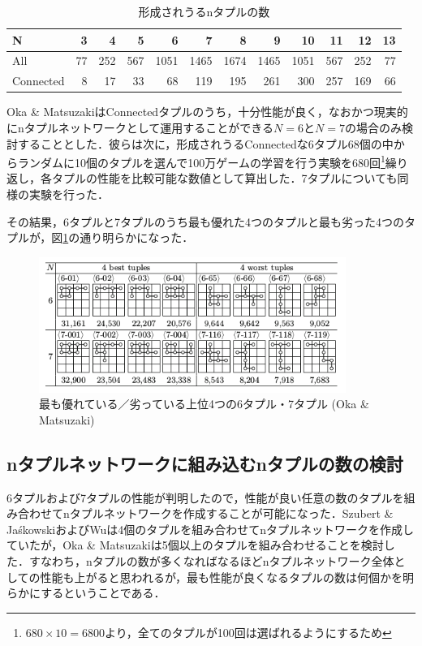 \documentclass{suribt}
\begin{document}
\begin{table}[t]
	\begin{center}
		\caption{形成されうるnタプルの数}
		\begin{tabular}{l|r|r|r|r|r|r|r|r|r|r|r} \hline
		N & 3 & 4 & 5 & 6 & 7 & 8 & 9 & 10 & 11 & 12 & 13 \\ \hline \hline
		All & 77 & 252 & 567 & 1051 & 1465 & 1674 & 1465 & 1051 & 567 & 252 & 77 \\ \hline
		Connected & 8 & 17 & 33 & 68 & 119 & 195 & 261 & 300 & 257 & 169 & 66 \\ \hline
		\end{tabular}
		\label{tab:ntuplesNumber}
	\end{center}
\end{table}

Oka \& MatsuzakiはConnectedタプルのうち，十分性能が良く，なおかつ現実的にnタプルネットワークとして運用することができる$N=6$と$N=7$の場合のみ検討することとした．彼らは次に，形成されうるConnectedな6タプル68個の中からランダムに10個のタプルを選んで100万ゲームの学習を行う実験を680回\footnote{$680 \times 10 = 6800$より，全てのタプルが100回は選ばれるようにするため}繰り返し，各タプルの性能を比較可能な数値として算出した．7タプルについても同様の実験を行った．

その結果，6タプルと7タプルのうち最も優れた4つのタプルと最も劣った4つのタプルが，図\ref{figure_004}の通り明らかになった．

\begin{figure}[t]
	\begin{center}
	\includegraphics[width=10cm]{figure_004.png}
	\caption{最も優れている／劣っている上位4つの6タプル・7タプル (Oka \& Matsuzaki)}
	\label{figure_004}
	\end{center}
\end{figure}

\subsection{nタプルネットワークに組み込むnタプルの数の検討}
6タプルおよび7タプルの性能が判明したので，性能が良い任意の数のタプルを組み合わせてnタプルネットワークを作成することが可能になった．Szubert \& Ja\'{s}kowskiおよびWuは4個のタプルを組み合わせてnタプルネットワークを作成していたが，Oka \& Matsuzakiは5個以上のタプルを組み合わせることを検討した．すなわち，nタプルの数が多くなればなるほどnタプルネットワーク全体としての性能も上がると思われるが，最も性能が良くなるタプルの数は何個かを明らかにするということである．
\end{document}
